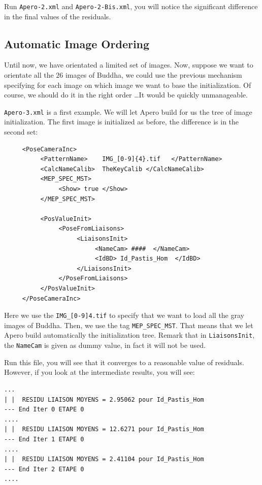 Run {\tt Apero-2.xml}  and {\tt Apero-2-Bis.xml}, you will notice
the significant difference in the final values of the residuals.



\subsection{Automatic Image Ordering}

\label{Apero:Ordering}

Until now, we have orientated a limited set of images. Now, suppose we
want to orientate all the $26$ images of Buddha, we could use the
previous mechanism specifying  for each image on which image
we want to base the initialization. Of course, we should do it
in the right order \dots It would be quickly unmanageable.

{\tt Apero-3.xml} is a first example. We will let Apero
build for us the tree of image initialization. The first
image is initialized as before, the difference is
in the second set:

{\scriptsize
\begin{verbatim}
     <PoseCameraInc>
          <PatternName>    IMG_[0-9]{4}.tif   </PatternName>
          <CalcNameCalib>  TheKeyCalib </CalcNameCalib>
          <MEP_SPEC_MST>
               <Show> true </Show>
          </MEP_SPEC_MST>

          <PosValueInit>
               <PoseFromLiaisons>
                    <LiaisonsInit>
                         <NameCam> ####  </NameCam>
                         <IdBD> Id_Pastis_Hom  </IdBD>
                    </LiaisonsInit>
               </PoseFromLiaisons>
          </PosValueInit>
     </PoseCameraInc>
\end{verbatim}
}

Here we use the {\tt IMG\_[0-9]{4}.tif} to specify that we want
to load all the gray images of Buddha. Then, we use the
tag {\tt MEP\_SPEC\_MST}. That means that we let Apero build
automatically the initialization tree. Remark that in
{\tt LiaisonsInit}, the {\tt NameCam} is given as dummy value,
in fact it will not be used.

Run this file, you will see that it converges to a reasonable
value of residuals.  However, if you look at the intermediate
results, you will see:

{\scriptsize
\begin{verbatim}
...
| |  RESIDU LIAISON MOYENS = 2.95062 pour Id_Pastis_Hom
--- End Iter 0 ETAPE 0
....
| |  RESIDU LIAISON MOYENS = 12.6271 pour Id_Pastis_Hom
--- End Iter 1 ETAPE 0
....
| |  RESIDU LIAISON MOYENS = 2.41104 pour Id_Pastis_Hom
--- End Iter 2 ETAPE 0
....
\end{verbatim}
}

